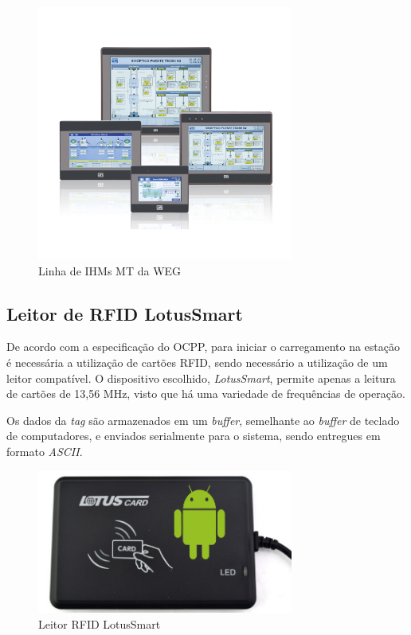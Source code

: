       \begin{figure}[H]
        \begin{center}
          \includegraphics[width=0.75\textwidth,natwidth=400,natheight=288]{assets/images/devices-hmi.jpg}
          \caption{Linha de IHMs MT da WEG}
          \label{fig:ihm}
        \end{center}
      \end{figure}

    \subsection{Leitor de RFID LotusSmart}
    \label{methodology:devices:rfid}

      De acordo com a especificação do \ac{OCPP}, para iniciar o carregamento na estação é necessária a utilização de cartões \ac{RFID}, sendo necessário a utilização de um leitor compatível. O dispositivo escolhido, \textit{LotusSmart}, permite apenas a leitura de cartões de 13,56 MHz, visto que há uma variedade de frequências de operação.

      Os dados da \textit{tag} são armazenados em um \textit{buffer}, semelhante ao \textit{buffer} de teclado de computadores, e enviados serialmente para o sistema, sendo entregues em formato \textit{ASCII}.

      \begin{figure}[H]
        \begin{center}
          \includegraphics[width=0.75\textwidth,natwidth=655,natheight=368]{assets/images/devices-rfid.jpg}
          \caption{Leitor RFID LotusSmart}
          \label{fig:rfid}
        \end{center}
      \end{figure}

